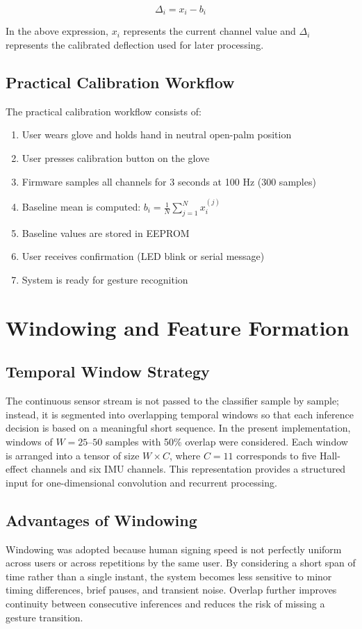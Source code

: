 \documentclass[12pt,a4paper]{report}
\begin{document}
\begin{equation}
\Delta_i = x_i - b_i
\label{eq:calibration}
\end{equation}

\noindent In the above expression, $x_i$ represents the current channel value and $\Delta_i$ represents the calibrated deflection used for later processing.

\subsection{Practical Calibration Workflow}
The practical calibration workflow consists of:
\begin{enumerate}
  \item User wears glove and holds hand in neutral open-palm position
  \item User presses calibration button on the glove
  \item Firmware samples all channels for 3 seconds at 100 Hz (300 samples)
  \item Baseline mean is computed: $b_i = \frac{1}{N} \sum_{j=1}^{N} x_i^{(j)}$
  \item Baseline values are stored in EEPROM
  \item User receives confirmation (LED blink or serial message)
  \item System is ready for gesture recognition
\end{enumerate}

\section{Windowing and Feature Formation}
\label{sec:impl_windowing}

\subsection{Temporal Window Strategy}
The continuous sensor stream is not passed to the classifier sample by sample; instead, it is segmented into overlapping temporal windows so that each inference decision is based on a meaningful short sequence. In the present implementation, windows of $W = 25$--$50$ samples with 50\% overlap were considered. Each window is arranged into a tensor of size $W \times C$, where $C = 11$ corresponds to five Hall-effect channels and six IMU channels. This representation provides a structured input for one-dimensional convolution and recurrent processing.

\subsection{Advantages of Windowing}
Windowing was adopted because human signing speed is not perfectly uniform across users or across repetitions by the same user. By considering a short span of time rather than a single instant, the system becomes less sensitive to minor timing differences, brief pauses, and transient noise. Overlap further improves continuity between consecutive inferences and reduces the risk of missing a gesture transition.
\end{document}
